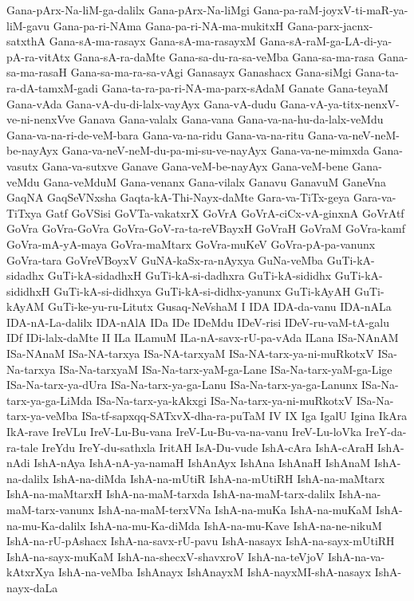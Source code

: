 {Gana-pArx-Na-liM-ga-dalilx
Gana-pArx-Na-liMgi
Gana-pa-raM-joyxV-ti-maR-ya-liM-gavu
Gana-pa-ri-NAma
Gana-pa-ri-NA-ma-mukitxH
Gana-parx-jacnx-satxthA
Gana-sA-ma-rasayx
Gana-sA-ma-rasayxM
Gana-sA-raM-ga-LA-di-ya-pA-ra-vitAtx
Gana-sA-ra-daMte
Gana-sa-du-ra-sa-veMba
Gana-sa-ma-rasa
Gana-sa-ma-rasaH
Gana-sa-ma-ra-sa-vAgi
Ganasayx
Ganashacx
Gana-siMgi
Gana-ta-ra-dA-tamxM-gadi
Gana-ta-ra-pa-ri-NA-ma-parx-sAdaM
Ganate
Gana-teyaM
Gana-vAda
Gana-vA-du-di-lalx-vayAyx
Gana-vA-dudu
Gana-vA-ya-titx-nenxV-ve-ni-nenxVve
Ganava
Gana-valalx
Gana-vana
Gana-va-na-hu-da-lalx-veMdu
Gana-va-na-ri-de-veM-bara
Gana-va-na-ridu
Gana-va-na-ritu
Gana-va-neV-neM-be-nayAyx
Gana-va-neV-neM-du-pa-mi-su-ve-nayAyx
Gana-va-ne-mimxda
Gana-vasutx
Gana-va-sutxve
Ganave
Gana-veM-be-nayAyx
Gana-veM-bene
Gana-veMdu
Gana-veMduM
Gana-venanx
Gana-vilalx
Ganavu
GanavuM
GaneVna
GaqNA
GaqSeVNxsha
Gaqta-kA-Thi-Nayx-daMte
Gara-va-TiTx-geya
Gara-va-TiTxya
Gatf
GoVSisi
GoVTa-vakatxrX
GoVrA
GoVrA-ciCx-vA-ginxnA
GoVrAtf
GoVra
GoVra-GoVra
GoVra-GoV-ra-ta-reVBayxH
GoVraH
GoVraM
GoVra-kamf
GoVra-mA-yA-maya
GoVra-maMtarx
GoVra-muKeV
GoVra-pA-pa-vanunx
GoVra-tara
GoVreVBoyxV
GuNA-kaSx-ra-nAyxya
GuNa-veMba
GuTi-kA-sidadhx
GuTi-kA-sidadhxH
GuTi-kA-si-dadhxra
GuTi-kA-sididhx
GuTi-kA-sididhxH
GuTi-kA-si-didhxya
GuTi-kA-si-didhx-yanunx
GuTi-kAyAH
GuTi-kAyAM
GuTi-ke-yu-ru-Litutx
Gusaq-NeVshaM
I
IDA
IDA-da-vanu
IDA-nALa
IDA-nA-La-dalilx
IDA-nAlA
IDa
IDe
IDeMdu
IDeV-risi
IDeV-ru-vaM-tA-galu
IDf
IDi-lalx-daMte
II
ILa
ILamuM
ILa-nA-savx-rU-pa-vAda
ILana
ISa-NAnAM
ISa-NAnaM
ISa-NA-tarxya
ISa-NA-tarxyaM
ISa-NA-tarx-ya-ni-muRkotxV
ISa-Na-tarxya
ISa-Na-tarxyaM
ISa-Na-tarx-yaM-ga-Lane
ISa-Na-tarx-yaM-ga-Lige
ISa-Na-tarx-ya-dUra
ISa-Na-tarx-ya-ga-Lanu
ISa-Na-tarx-ya-ga-Lanunx
ISa-Na-tarx-ya-ga-LiMda
ISa-Na-tarx-ya-kAkxgi
ISa-Na-tarx-ya-ni-muRkotxV
ISa-Na-tarx-ya-veMba
ISa-tf-sapxqq-SATxvX-dha-ra-puTaM
IV
IX
Iga
IgalU
Igina
IkAra
IkA-rave
IreVLu
IreV-Lu-Bu-vana
IreV-Lu-Bu-va-na-vanu
IreV-Lu-loVka
IreY-da-ra-tale
IreYdu
IreY-du-sathxla
IritAH
IsA-Du-vude
IshA-cAra
IshA-cAraH
IshA-nAdi
IshA-nAya
IshA-nA-ya-namaH
IshAnAyx
IshAna
IshAnaH
IshAnaM
IshA-na-dalilx
IshA-na-diMda
IshA-na-mUtiR
IshA-na-mUtiRH
IshA-na-maMtarx
IshA-na-maMtarxH
IshA-na-maM-tarxda
IshA-na-maM-tarx-dalilx
IshA-na-maM-tarx-vanunx
IshA-na-maM-terxVNa
IshA-na-muKa
IshA-na-muKaM
IshA-na-mu-Ka-dalilx
IshA-na-mu-Ka-diMda
IshA-na-mu-Kave
IshA-na-ne-nikuM
IshA-na-rU-pAshacx
IshA-na-savx-rU-pavu
IshA-nasayx
IshA-na-sayx-mUtiRH
IshA-na-sayx-muKaM
IshA-na-shecxV-shavxroV
IshA-na-teVjoV
IshA-na-va-kAtxrXya
IshA-na-veMba
IshAnayx
IshAnayxM
IshA-nayxMI-shA-nasayx
IshA-nayx-daLa
}
